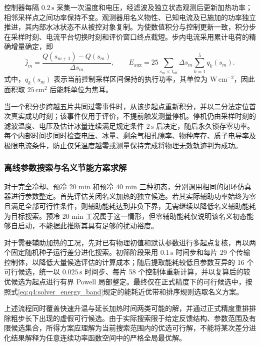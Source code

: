 控制器每隔 \(0.2\,\mathrm s\) 采集一次温度和电压，经滤波及独立状态观测后更新加热功率；相邻采样点之间功率保持不变。观测器用名义物性、已知电流及已施加的功率独立推进，其内部水冰状态不从被控对象复制。为使数值积分与控制更新一致，积分步在采样时刻、电流平台切换时刻和评价窗口终点截短。步内电流采用累计电荷的精确增量确定，即
\begin{equation}
\bar j_m=\frac{Q(s_{m+1})-Q(s_m)}{\Delta s_m},\qquad
E_{\mathrm{aux}}=25\sum_{s_m<t_{\mathrm{off}}}\Delta s_m\sum_{k=1}^{5}q_k(s_m).
\tag{7-@@7@@}\label{eq:q4:solver_charge_energy}
\end{equation}
式中，\(q_k(s_m)\) 表示当前控制采样区间保持的执行功率，其单位为 \(\mathrm{W\,cm^{-2}}\)，因此面积取 \(25\,\mathrm{cm^2}\) 后能耗单位为焦耳。

当一个积分步跨越五片共同过零事件时，从该步起点重新积分，并以二分法定位首次真实成功时刻；该事件仅用于评价，不提前触发测量停机。停机仍由采样时刻的滤波温度、电压及估计冰量连续满足规定条件 \(2\,\mathrm s\) 后决定，随后永久锁存零功率。每个内部时间步同时检查电压、冰量、剩余气相孔隙率、物种库存、质子电导率及极限电流条件，防止仅凭温度越零或测量保持完成将物理无效轨迹判为成功。

\subsubsection{离线参数搜索与名义节能方案求解}
对于完全冷却、预冷 20 min 和预冷 40 min 三种初态，分别调用相同的闭环仿真器进行参数整定。首先评估关闭名义加热的独立候选。若其实际辅助功率始终为零且满足全部可行性条件，则辅助能耗达到非负下界，无需继续以降低名义辅助能耗为目标搜索。预冷 20 min 工况属于这一情形，但零辅助能耗仅说明该名义初态能够自启动，不能据此推断其具有足够的扰动裕度。

对于需要辅助加热的工况，先对已有物理初值和默认参数进行多起点复核，再以两个固定随机种子运行差分进化搜索。初筛阶段采用 \(0.1\,\mathrm s\) 时间步和每片 29 个传输控制体，以降低大量候选评估的计算成本；随后提取能耗较低且参数互异的 16 个可行候选，统一以 \(0.025\,\mathrm s\) 时间步、每片 58 个控制体重新计算，并以复算后的较优候选为起点进行有界 Powell 局部整定。最终仅在正式精度下的可行候选中，按照式\eqref{eq:q4:solver_energy_band}规定的能耗近优带和排序规则选取名义方案。

上述流程同时覆盖快速升温与延长加热时间两类可能的解，并通过正式精度重排排除粗步长下出现的虚假可行候选。由于实际搜索限于给定反馈结构、参数范围及有限候选集合，所得方案应理解为当前搜索范围内的优选可行解，不能将某次差分进化结果解释为任意连续功率函数空间中的严格全局最优解。

